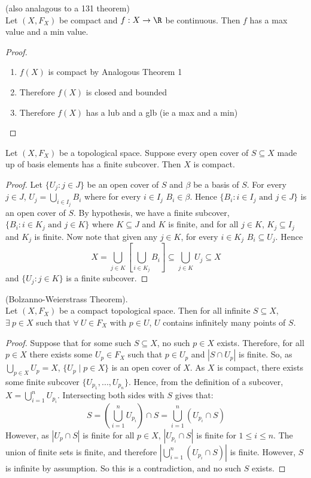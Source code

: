 \begin{theorem} (also analagous to a 131 theorem)\\
Let $(X, F_X)$ be compact and $f : X \rightarrow \R$ be continuous. Then $f$ has a max value and a min value. 
\end{theorem}
\begin{proof}
\begin{enumerate}
\item $f(X)$ is compact by Analogous Theorem 1
\item Therefore $f(X)$ is closed and bounded
\item Therefore $f(X)$ has a lub and a glb (ie a max and a min)
\end{enumerate}
\end{proof}

\begin{smallfact}
Let $(X, F_X)$ be a topological space. Suppose every open cover of $S \subseteq X$ made up of basis elements has a finite subcover. Then $X$ is compact. 
\end{smallfact}
\begin{proof}
Let $\{U_j : j \in J\}$ be an open cover of $S$ and $\beta$ be a basis of $S$. For every $j \in J$, $U_j = \bigcup_{i \in I_j}B_i$ where for every $i \in I_j$ $B_i \in \beta$. Hence $\{B_i : i \in I_j \text{ and } j \in J\}$ is an open cover of $S$. By hypothesis, we have a finite subcover, $\{B_i : i \in K_j \text{ and } j \in K\}$ where $K \subseteq J$ and $K$ is finite, and for all $j \in K$, $K_j \subseteq I_j$ and $K_j$ is finite. Now note that given any $j \in K$, for every $i \in K_j$ $B_i \subseteq U_j$.  Hence 
\[X = \bigcup_{j\in K} \left[ \bigcup_{i \in K_j} B_i \right] \subseteq \bigcup_{j\in K} U_j \subseteq X\]
and $\{U_j : j\in K\}$ is a finite subcover. 
\end{proof}

\begin{theorem} (Bolzanno-Weierstrass Theorem).\\
Let $(X,F_X)$ be a compact topological space.  Then for all infinite $S \subseteq X$, $\exists \ p \in X$ such that $\forall \ U \in F_X$ with $p \in U$, $U$ contains infinitely many points of $S$.
\end{theorem}
\begin{proof}
Suppose that for some such $S \subseteq X$, no such $p \in X$ exists.  Therefore, for all $p \in X$ there exists some $U_p \in F_X$ such that $p \in U_p$ and $|S \cap U_p|$ is finite.  So, as $\displaystyle{\bigcup_{p \in X} U_p = X}$, $\{U_p \mid p \in X\}$ is an open cover of $X$.  As $X$ is compact, there exists some finite subcover $\{U_{p_1},...,U_{p_n}\}$.  Hence, from the definition of a subcover, $\displaystyle{X = \bigcup_{i=1}^n U_{p_i}}$.  Intersecting both sides with $S$ gives that:
\[S = \left(\bigcup_{i=1}^n U_{p_i}\right) \cap S = \bigcup_{i=1}^n (U_{p_i} \cap S)\]
However, as $|U_p \cap S|$ is finite for all $p \in X$, $|U_{p_i} \cap S|$ is finite for $1 \leq i \leq n$.  The union of finite sets is finite, and therefore $\left|\bigcup_{i=1}^n (U_{p_i} \cap S)\right|$ is finite.  However, $S$ is infinite by assumption.  So this is a contradiction, and no such $S$ exists.
\end{proof}

